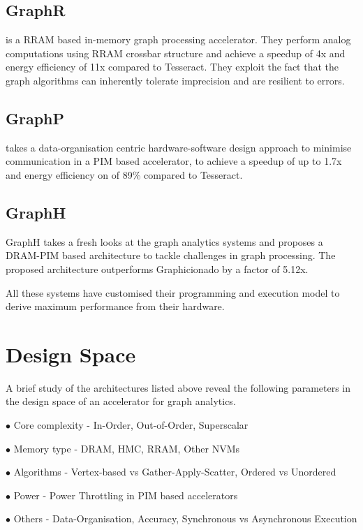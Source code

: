 \documentclass[journal,onecolumn]{IEEEtran}
\begin{document}
 \subsection{GraphR} \cite{GraphR} is a RRAM based in-memory graph processing accelerator. They perform analog computations using RRAM crossbar structure and achieve a speedup of 4x and energy efficiency of 11x compared to Tesseract. They exploit the fact that the graph algorithms can inherently tolerate imprecision and are resilient to errors.
 
 \subsection{GraphP} \cite{GraphP} takes a data-organisation centric hardware-software design approach to minimise communication in a PIM based accelerator, to achieve a speedup of up to 1.7x and energy efficiency on of 89\% compared to Tesseract.
 
 \subsection{GraphH} \cite{GraphH} GraphH takes a fresh looks at the graph analytics systems and proposes a DRAM-PIM based architecture to tackle challenges in graph processing. The proposed architecture outperforms Graphicionado by a factor of 5.12x.

All these systems have customised their programming and execution model to derive maximum performance from their hardware.

\section{Design Space} \label{DesignSpace}
A brief study of the architectures listed above reveal the following parameters in the design space of an accelerator for graph analytics. 

\begin{description}
 \item{$\bullet$ Core complexity} - In-Order, Out-of-Order, Superscalar
 \item{$\bullet$ Memory type} - DRAM, HMC, RRAM, Other NVMs
 \item{$\bullet$ Algorithms} - Vertex-based \cite{Pregel} vs Gather-Apply-Scatter\cite{PowerGraph}, Ordered vs Unordered\cite{OvsUO}
 \item{$\bullet$ Power} - Power Throttling in PIM based accelerators\cite{PM3}
 \item{$\bullet$ Others} - Data-Organisation\cite{GraphP}, Accuracy\cite{GraphR}, Synchronous vs Asynchronous Execution\cite{Tesseract}
\end{description}
\end{document}
